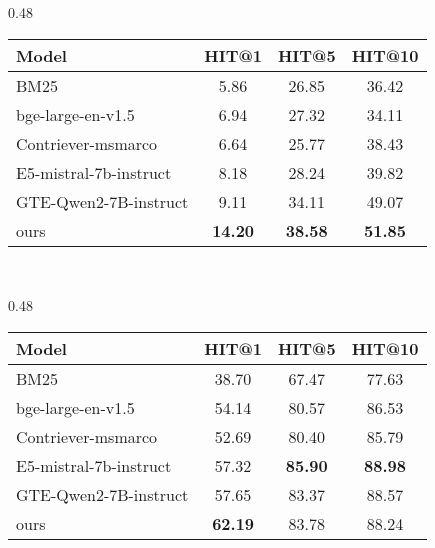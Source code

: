 \begin{table*}[htbp]
    \begin{subtable}[t]{0.48\textwidth}
        \centering
        \begin{tabular}{lccc}
        \toprule
        \textbf{Model} & \textbf{HIT@1} & \textbf{HIT@5} & \textbf{HIT@10}\\
        \midrule
        BM25 & 5.86 & 26.85 & 36.42 \\
        bge-large-en-v1.5 & 6.94 & 27.32 & 34.11\\
        Contriever-msmarco & 6.64 & 25.77 & 38.43 \\
        E5-mistral-7b-instruct & 8.18 & 28.24 & 39.82\\
        GTE-Qwen2-7B-instruct & 9.11 & 34.11 & 49.07 \\
        ours & \bf 14.20& \bf 38.58& \bf 51.85\\
        \bottomrule
        \end{tabular}
        \caption{AllSides}
    \end{subtable}
    ~~\quad
    \begin{subtable}[t]{0.48\textwidth}
        \centering
        \begin{tabular}{lccc}
        \toprule
        \textbf{Model} & \textbf{HIT@1} & \textbf{HIT@5} & \textbf{HIT@10}\\
        \midrule
        BM25 & 38.70 & 67.47 & 77.63 \\
        bge-large-en-v1.5 & 54.14 & 80.57 & 86.53\\
        Contriever-msmarco & 52.69 & 80.40 & 85.79 \\
        E5-mistral-7b-instruct & 57.32 & \bf 85.90 & \bf 88.98 \\
        GTE-Qwen2-7B-instruct & 57.65 & 83.37 & 88.57\\
        ours & \bf 62.19& 83.78& 88.24\\
        \bottomrule
        \end{tabular}
        \caption{AGNews}
    \end{subtable}

    \caption{Comparisons to Off-The-Shelf Retrieval Models Across Datasets}
    \label{tab:dense_retrieval_comparison}
\end{table*}
